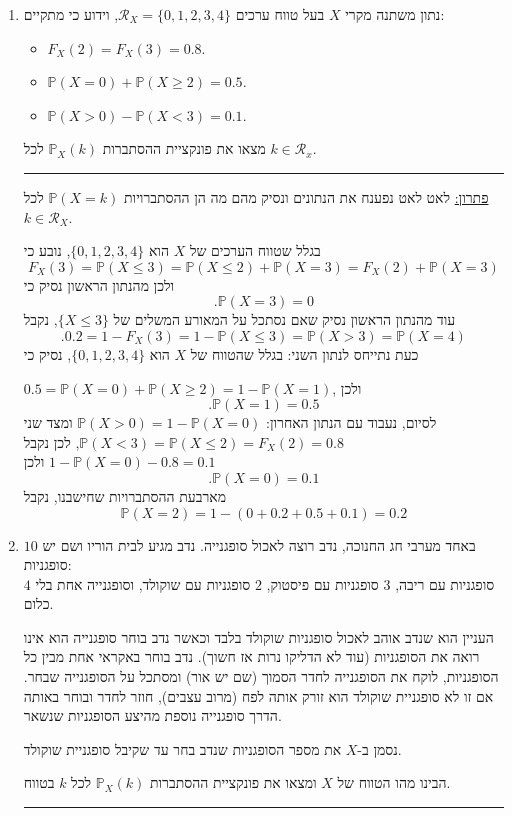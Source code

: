 \documentclass[12pt, a4paper]{article}
\newcommand{\cR}{\mathcal{R}}
\newcommand{\PP}{\mathbb{P}}
\begin{document}
\begin{enumerate}
\newpage

\item
נתון משתנה מקרי
$X$
בעל טווח ערכים
$\cR_X=\{0,1,2,3,4\}$,
וידוע כי מתקיים:
\begin{itemize}
\item
$F_X(2)=F_X(3)=0.8$.
\item
$\PP(X=0)+\PP(X\ge 2)=0.5$.
\item
$\PP(X>0)-\PP(X<3)=0.1$.
\end{itemize}
מצאו את פונקציית ההסתברות 
$\PP_X(k)$
לכל
$k\in \cR_x$.

\noindent\rule{15cm}{0.4pt}

\underline{פתרון:}
לאט לאט נפענח את הנתונים ונסיק מהם מה הן ההסתברויות
$\PP(X=k)$
לכל
$k\in \cR_X$.

בגלל שטווח הערכים של
$X$
הוא
$\{0,1,2,3,4\}$,
נובע כי
$$F_X(3)=\PP(X\le 3)=\PP(X\le 2)+\PP(X=3)=F_X(2)+\PP(X=3)$$
ולכן מהנתון הראשון נסיק כי
$$\boxed{.\PP(X=3)=0}$$
עוד מהנתון הראשון נסיק שאם נסתכל על המאורע המשלים של
$\{X\le 3\}$,
 נקבל
$$\boxed{.0.2}=1-F_X(3)=1-\PP(X\le 3)=\PP(X>3)=
\boxed{\PP(X=4)}$$
כעת נתייחס לנתון השני: בגלל שהטווח של 
$X$
הוא 
$\{0,1,2,3,4\}$,
נסיק כי

$0.5=\PP(X=0)+\PP(X\ge 2)=1-\PP(X=1)$,
ולכן
$$\boxed{.\PP(X=1)=0.5}$$
לסיום, נעבוד עם הנתון האחרון:
$\PP(X>0)=1-\PP(X=0)$
ומצד שני
$\PP(X<3)=\PP(X\le 2)=F_X(2)=0.8$,
לכן נקבל
$1-\PP(X=0)-0.8=0.1$
ולכן
$$\boxed{.\PP(X=0)=0.1}$$
מארבעת ההסתברויות שחישבנו, נקבל
$$\boxed{\PP(X=2)}=1-(0+0.2+0.5+0.1)=\boxed{0.2}$$

\newpage

\item
באחד מערבי חג החנוכה, נדב רוצה לאכול סופגנייה. נדב מגיע לבית הוריו ושם יש 
$10$
סופגניות:
\\
$4$
סופגניות עם ריבה,
$3$
סופגניות עם פיסטוק,
$2$
סופגניות עם שוקולד,
וסופגנייה אחת בלי כלום.

העניין הוא שנדב אוהב לאכול סופגניות שוקולד בלבד
וכאשר נדב בוחר סופגנייה הוא אינו רואה את הסופגניות (עוד לא הדליקו נרות אז חשוך). 
נדב בוחר באקראי אחת מבין כל הסופגניות, לוקח את הסופגנייה לחדר הסמוך (שם יש אור) ומסתכל על הסופגנייה שבחר. אם זו לא סופגניית שוקולד הוא זורק אותה לפח (מרוב עצבים), חוזר לחדר ובוחר באותה הדרך סופגנייה נוספת מהיצע הסופגניות שנשאר.

נסמן ב-$X$
את מספר הסופגניות שנדב בחר עד שקיבל סופגניית שוקולד.

הבינו מהו הטווח של
$X$
ומצאו את פונקציית  ההסתברות
$\PP_X(k)$
לכל
$k$
בטווח.


\noindent\rule{15cm}{0.4pt}


\end{enumerate}
\end{document}
